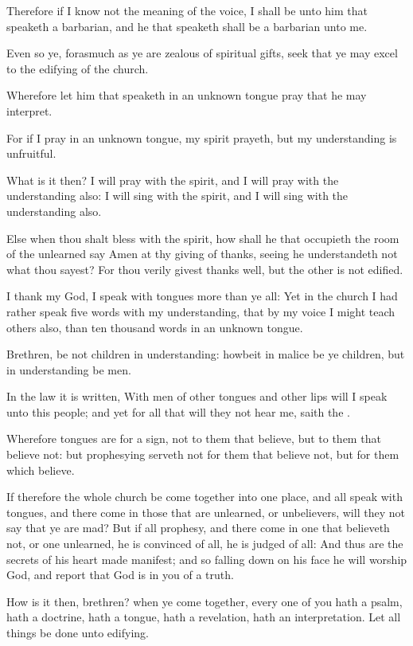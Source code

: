 \Verse Therefore if I know not the meaning of the voice, I shall be unto him that speaketh a barbarian, and he that speaketh shall be a barbarian unto me.

\Verse Even so ye, forasmuch as ye are zealous of spiritual gifts, seek that ye may excel to the edifying of the church.

\Verse Wherefore let him that speaketh in an unknown tongue pray that he may interpret.

\Verse For if I pray in an unknown tongue, my spirit prayeth, but my understanding is unfruitful.

\Verse What is it then? I will pray with the spirit, and I will pray with the understanding also: I will sing with the spirit, and I will sing with the understanding also.

\Verse Else when thou shalt bless with the spirit, how shall he that occupieth the room of the unlearned say Amen at thy giving of thanks, seeing he understandeth not what thou sayest?  \Verse For thou verily givest thanks well, but the other is not edified.

\Verse I thank my God, I speak with tongues more than ye all: \Verse Yet in the church I had rather speak five words with my understanding, that by my voice I might teach others also, than ten thousand words in an unknown tongue.

\Verse Brethren, be not children in understanding: howbeit in malice be ye children, but in understanding be men.

\Verse In the law it is written, With men of other tongues and other lips will I speak unto this people; and yet for all that will they not hear me, saith the \LORD.

\Verse Wherefore tongues are for a sign, not to them that believe, but to them that believe not: but prophesying serveth not for them that believe not, but for them which believe.

\Verse If therefore the whole church be come together into one place, and all speak with tongues, and there come in those that are unlearned, or unbelievers, will they not say that ye are mad?  \Verse But if all prophesy, and there come in one that believeth not, or one unlearned, he is convinced of all, he is judged of all: \Verse And thus are the secrets of his heart made manifest; and so falling down on his face he will worship God, and report that God is in you of a truth.

\Verse How is it then, brethren? when ye come together, every one of you hath a psalm, hath a doctrine, hath a tongue, hath a revelation, hath an interpretation. Let all things be done unto edifying.

